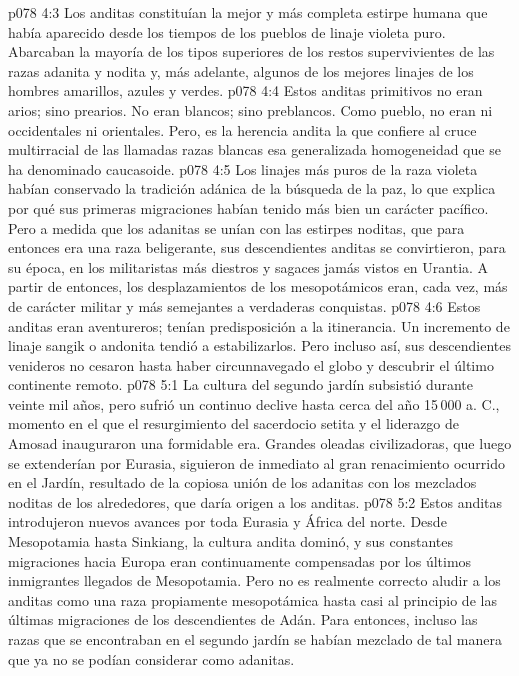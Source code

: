 \vs p078 4:3 Los anditas constituían la mejor y más completa estirpe humana que había aparecido desde los tiempos de los pueblos de linaje violeta puro. Abarcaban la mayoría de los tipos superiores de los restos supervivientes de las razas adanita y nodita y, más adelante, algunos de los mejores linajes de los hombres amarillos, azules y verdes.
\vs p078 4:4 \pc Estos anditas primitivos no eran arios; sino prearios. No eran blancos; sino preblancos. Como pueblo, no eran ni occidentales ni orientales. Pero, es la herencia andita la que confiere al cruce multirracial de las llamadas razas blancas esa generalizada homogeneidad que se ha denominado caucasoide.
\vs p078 4:5 \pc Los linajes más puros de la raza violeta habían conservado la tradición adánica de la búsqueda de la paz, lo que explica por qué sus primeras migraciones habían tenido más bien un carácter pacífico. Pero a medida que los adanitas se unían con las estirpes noditas, que para entonces era una raza beligerante, sus descendientes anditas se convirtieron, para su época, en los militaristas más diestros y sagaces jamás vistos en Urantia. A partir de entonces, los desplazamientos de los mesopotámicos eran, cada vez, más de carácter militar y más semejantes a verdaderas conquistas.
\vs p078 4:6 Estos anditas eran aventureros; tenían predisposición a la itinerancia. Un incremento de linaje sangik o andonita tendió a estabilizarlos. Pero incluso así, sus descendientes venideros no cesaron hasta haber circunnavegado el globo y descubrir el último continente remoto.
\vs p078 5:1 La cultura del segundo jardín subsistió durante veinte mil años, pero sufrió un continuo declive hasta cerca del año 15\,000 a. C., momento en el que el resurgimiento del sacerdocio setita y el liderazgo de Amosad inauguraron una formidable era. Grandes oleadas civilizadoras, que luego se extenderían por Eurasia, siguieron de inmediato al gran renacimiento ocurrido en el Jardín, resultado de la copiosa unión de los adanitas con los mezclados noditas de los alrededores, que daría origen a los anditas.
\vs p078 5:2 Estos anditas introdujeron nuevos avances por toda Eurasia y África del norte. Desde Mesopotamia hasta Sinkiang, la cultura andita dominó, y sus constantes migraciones hacia Europa eran continuamente compensadas por los últimos inmigrantes llegados de Mesopotamia. Pero no es realmente correcto aludir a los anditas como una raza propiamente mesopotámica hasta casi al principio de las últimas migraciones de los descendientes de Adán. Para entonces, incluso las razas que se encontraban en el segundo jardín se habían mezclado de tal manera que ya no se podían considerar como adanitas.
